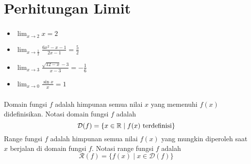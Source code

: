 \documentclass{../../kalkulus-ppt}
\newcommand{\dom}{\mathcal{D}}
\newcommand{\rng}{\mathcal{R}}
\begin{document}
\section{Perhitungan Limit}
\begin{frame}
    \frametitle{\insertsection}
    \begin{contoh}
        \begin{itemize}
            \item $\displaystyle\lim_{x\to 2} x=2$
            \item $\displaystyle\lim_{x\to \frac{1}{2}} \frac{6x^2-x-1}{2x-1}=\frac{5}{2}$
            \item $\displaystyle\lim_{x\to 3} \frac{\sqrt{12-x}-3}{x-3}=-\frac{1}{6}$
            \item $\displaystyle\lim_{x\to 0} \frac{\sin x}{x}=1$
        \end{itemize}
    \end{contoh}
\end{frame}
\begin{frame}
    \frametitle{\insertsection}
    \begin{definisi}
        Domain fungsi $f$ adalah himpunan semua nilai $x$ yang memenuhi $f(x)$ didefinisikan. Notasi domain fungsi $f$ adalah \[\dom(f)=\{x\in\R\mid f(x)\text{ terdefinisi}\}\]
        Range fungsi $f$ adalah himpunan semua nilai $f(x)$ yang mungkin diperoleh saat $x$ berjalan di domain fungsi $f$. Notasi range fungsi $f$ adalah \[\rng(f)=\{f(x)\mid x\in\dom(f)\}\]
    \end{definisi}
\end{frame}
\end{document}
